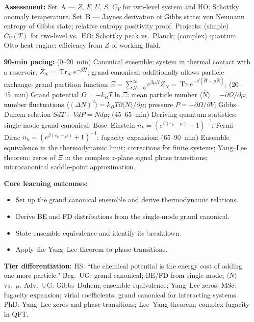 \documentclass[11pt,a4paper]{article}
\begin{document}
\begin{tcolorbox}[modulebox, title={Module~II.7 --- Lecture L01: Density Operators in Thermodynamics}]
\medskip\textbf{Assessment:}
Set~A --- $Z$, $F$, $U$, $S$, $C_V$ for two-level system and HO; Schottky anomaly temperature.
Set~B --- Jaynes derivation of Gibbs state; von Neumann entropy of Gibbs state; relative entropy positivity proof.
Projects: (simple) $C_V(T)$ for two-level vs.\ HO: Schottky peak vs.\ Planck;
(complex) quantum Otto heat engine: efficiency from $Z$ of working fluid.
\end{tcolorbox}

\medskip

\begin{tcolorbox}[modulebox, title={Module~II.7 --- Lecture L02: Canonical and Grand-Canonical Ensembles}]
\textbf{90-min pacing:} (0--20~min) Canonical ensemble: system in thermal contact with a reservoir; $Z_N=\operatorname{Tr}_Ne^{-\beta\hat{H}}$; grand canonical: additionally allows particle exchange; grand partition function $\Xi=\sum_{N=0}^\infty e^{\beta\mu N}Z_N=\operatorname{Tr}e^{-\beta(\hat{H}-\mu\hat{N})}$; (20--45~min) Grand potential $\Omega=-k_BT\ln\Xi$; mean particle number $\langle\hat{N}\rangle=-\partial\Omega/\partial\mu$; number fluctuations $\langle(\Delta N)^2\rangle=k_BT\partial\langle N\rangle/\partial\mu$; pressure $P=-\partial\Omega/\partial V$; Gibbs--Duhem relation $SdT+Vd P=Nd\mu$; (45--65~min) Deriving quantum statistics: single-mode grand canonical; Bose--Einstein $n_k=(e^{\beta(\varepsilon_k-\mu)}-1)^{-1}$; Fermi--Dirac $n_k=(e^{\beta(\varepsilon_k-\mu)}+1)^{-1}$; fugacity expansion; (65--90~min) Ensemble equivalence in the thermodynamic limit; corrections for finite systems; Yang--Lee theorem: zeros of $\Xi$ in the complex $z$-plane signal phase transitions; microcanonical saddle-point approximation.

\medskip\textbf{Core learning outcomes:}
\begin{itemize}[leftmargin=1.4em,topsep=2pt,itemsep=1pt]
  \item Set up the grand canonical ensemble and derive thermodynamic relations.
  \item Derive BE and FD distributions from the single-mode grand canonical.
  \item State ensemble equivalence and identify its breakdown.
  \item Apply the Yang--Lee theorem to phase transitions.
\end{itemize}

\medskip\textbf{Tier differentiation:}
HS: ``the chemical potential is the energy cost of adding one more particle.''
Beg.\ UG: grand canonical; BE/FD from single-mode; $\langle N\rangle$ vs.\ $\mu$.
Adv.\ UG: Gibbs--Duhem; ensemble equivalence; Yang--Lee zeros.
MSc: fugacity expansion; virial coefficients; grand canonical for interacting systems.
PhD: Yang--Lee zeros and phase transitions; Lee--Yang theorem; complex fugacity in QFT.


\end{tcolorbox}
\end{document}
